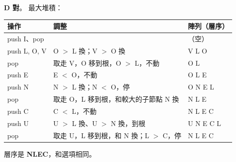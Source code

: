 \begin{pastsoln}
\textbf{D 對}。 最大堆積：
\begin{center}
\small
\begin{tabular}{lll}
\toprule
操作 & 調整 & 陣列（層序） \\
\midrule
push I、pop & & （空） \\
push L, O, V & O $>$ L 換；V $>$ O 換 & V L O \\
pop & 取走 V，O 移到根，O $>$ L，不動 & O L \\
push E & E $<$ O，不動 & O L E \\
push N & N $>$ L 換；N $<$ O，停 & O N E L \\
pop & 取走 O，L 移到根，和較大的子節點 N 換 & N L E \\
push C & C $<$ L，不動 & N L E C \\
push U & U $>$ L 換、U $>$ N 換，到根 & U N E C L \\
pop & 取走 U，L 移到根，和 N 換；L $>$ C，停 & N L E C \\
\bottomrule
\end{tabular}
\end{center}
層序是 \textbf{NLEC}，和選項相同。
\end{pastsoln}
